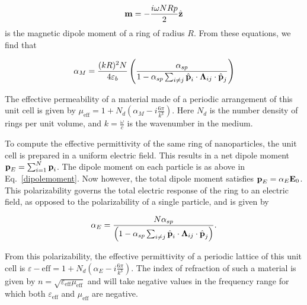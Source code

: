 \documentclass[journal=apchd5,manuscript=article]{achemso}
\begin{document}
\begin{equation}
\textrm{\textbf{m}} = -\frac{i\omega NRp}{2}\hat{\textrm{\textbf{z}}}
\label{magneticmoment}
\end{equation}
is the magnetic dipole moment of a ring of radius $R$. From these equations, we find that

\begin{equation}
\alpha_{M} = \frac{(kR)^{2}N}{4\varepsilon_{b}}\left(\frac{\alpha_{sp}}{1 - \alpha_{sp}\sum_{i\neq j}\hat{\textrm{\textbf{p}}}_{i} \cdot \boldsymbol{\Lambda}_{ij}\cdot\hat{\textrm{\textbf{p}}}_{j} }\right)
\label{alphaM}
\end{equation}

The effective permeability of a material made of a periodic arrangement of this unit cell is given by $\mu_{\textrm{eff}} = 1 + N_{d}\left(\alpha_{M} - i\frac{6\pi}{k^3}\right)$. Here $N_{d}$ is the number density of rings per unit volume, and $k = \frac{\omega}{c}$ is the wavenumber in the medium.

To compute the effective permittivity of the same ring of nanoparticles, the unit cell is prepared in a uniform electric field. This results in a net dipole moment $\textrm{\textbf{p}}_{E} = \sum_{i=1}^{N} \textrm{\textbf{p}}_{i}$. The dipole moment on each particle is as above in Eq.~\ref{dipolemoment}. Now however, the total dipole moment satisfies $\textrm{\textbf{p}}_{E} = \alpha_{E}\textrm{\textbf{E}}_{0}$. This polarizability governs the total electric response of the ring to an electric field, as opposed to the polarizability of a single particle, and is given by

\begin{equation}
\alpha_{E} = \frac{N\alpha_{sp}}{\left(1 - \alpha_{sp}\sum_{i\neq j}\hat{\textrm{\textbf{p}}}_{i} \cdot \boldsymbol{\Lambda}_{ij}\cdot\hat{\textrm{\textbf{p}}}_{j}\right)}.
\label{alphaE}
\end{equation}

From this polarizability, the effective permittivity of a periodic lattice of this unit cell is $\varepsilon-{\textrm{eff}} = 1 + N_{d}\left(\alpha_{E} - i\frac{6\pi}{k^3} \right)$. The index of refraction of such a material is given by $n = \sqrt{\varepsilon_{\textrm{eff}}\mu_{\textrm{eff}}}$ and will take negative values in the frequency range for which both $\varepsilon_{\textrm{eff}}$ and $\mu_{\textrm{eff}}$ are negative.
\end{document}
